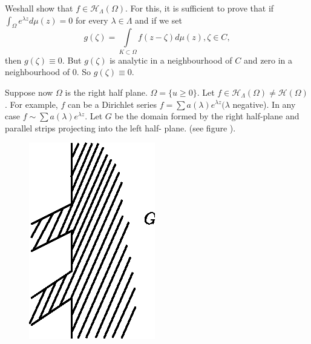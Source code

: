 We\pageoriginale shall
show that $f \in \mathscr{H}_{\Lambda}(\Omega)$. For this, it is
sufficient to prove that if $\int_{\Omega} e^{\lambda z} d\mu (z) =0$
for every $\lambda \in \Lambda$ and if we set 
 $$
 g(\zeta) = \int\limits_{K \subset \Omega} f(z - \zeta) d \mu (z),
 \zeta \in C, 
 $$
 then $g(\zeta) \equiv 0$. But $g (\zeta)$ is analytic in a
 neighbourhood of $C$ and zero in a neighbourhood of 0. So $g(\zeta)
 \equiv 0$. 
 
\noindent 
\begin{minipage}[c]{5.8cm}
\quad Suppose now $\Omega$ is the right half plane. $\Omega = \{u \ge 0
 \}$. Let $f \in \mathscr{H}_{\Lambda}(\Omega) \neq
 \mathscr{H}(\Omega)$. For example, $f$ can be a Dirichlet series $f =
 \sum a (\lambda) e^{\lambda z} ( \lambda$ negative). In any case $f
 \sim \sum a (\lambda) e^{\lambda z}$. Let $G$ be the domain formed by
 the right half-plane and parallel strips projecting into the left
 half- plane. (see figure ). 
\end{minipage}
\begin{minipage}[c]{5cm}
\begin{figure}[H]
\centerline{\includegraphics{vol15-figures/fig15-5.eps}}
\end{figure}
\end{minipage}
\medskip

